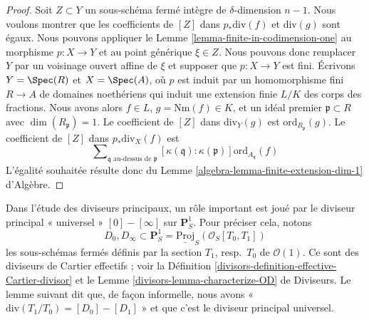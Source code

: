 \begin{proof}
Soit $Z \subset Y$ un sous-schéma fermé intègre de $\delta$-dimension
$n - 1$. Nous voulons montrer que les coefficients de $[Z]$ dans
$p_*\text{div}(f)$ et $\text{div}(g)$ sont égaux. Nous pouvons appliquer le
Lemme \ref{lemma-finite-in-codimension-one}
au morphisme $p : X \to Y$ et au point générique $\xi \in Z$.
Nous pouvons donc remplacer $Y$ par un
voisinage ouvert affine de $\xi$ et supposer que $p : X \to Y$ est fini.
Écrivons $Y = \Spec(R)$ et $X = \Spec(A)$, où $p$ est induit
par un homomorphisme fini $R \to A$ de domaines noethériens qui induit
une extension finie $L/K$ des corps des fractions.
Nous avons alors $f \in L$, $g = \text{Nm}(f) \in K$,
et un idéal premier $\mathfrak p \subset R$ avec $\dim(R_{\mathfrak p}) = 1$.
Le coefficient de $[Z]$ dans $\text{div}_Y(g)$ est
$\text{ord}_{R_\mathfrak p}(g)$.
Le coefficient de $[Z]$ dans $p_*\text{div}_X(f)$ est
$$
\sum\nolimits_{\mathfrak q\text{ au-dessus de }\mathfrak p}
[\kappa(\mathfrak q) : \kappa(\mathfrak p)]
\text{ord}_{A_{\mathfrak q}}(f)
$$
L'égalité souhaitée résulte donc du
Lemme \ref{algebra-lemma-finite-extension-dim-1} d'Algèbre.
\end{proof}

\noindent
Dans l'étude des diviseurs principaux, un rôle important
est joué par le diviseur principal « universel » $[0] - [\infty]$
sur $\mathbf{P}^1_S$. Pour préciser cela, notons
\begin{equation}
\label{equation-zero-infty}
D_0, D_\infty \subset
\mathbf{P}^1_S = \underline{\text{Proj}}_S(\mathcal{O}_S[T_0, T_1])
\end{equation}
les sous-schémas fermés définis par la section $T_1$, resp.\ $T_0$
de $\mathcal{O}(1)$. Ce sont des diviseurs de Cartier effectifs ; voir la
Définition \ref{divisors-definition-effective-Cartier-divisor}
et le Lemme \ref{divisors-lemma-characterize-OD} de Diviseurs.
Le lemme suivant dit que, de façon informelle, nous avons
« $\text{div}(T_1/T_0) = [D_0] - [D_1]$ » et que c'est le
diviseur principal universel.

